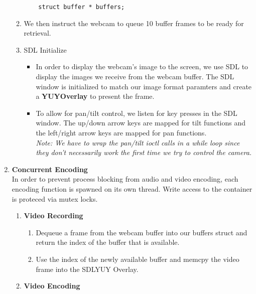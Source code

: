 \documentclass[a4paper]{article}
\begin{document}
\begin{enumerate}
\begin{enumerate}
\begin{verbatim}
	struct buffer * buffers;

			\end{verbatim}
		\item We then instruct the webcam to queue 10 buffer frames to be ready for retrieval.
		\item SDL Initialize
			\begin{itemize}
				\item In order to display the webcam's image to the screen, we use SDL to display the images we receive from the webcam buffer. The SDL window is initialized to match our image format paramters and create a \textbf{YUYOverlay} to present the frame.
				\item To allow for pan/tilt control, we listen for key presses in the SDL window. The up/down arrow keys are mapped for tilt functions and the left/right arrow keys are mapped for pan functions.
	\\\it Note: We have to wrap the pan/tilt ioctl calls in a while loop since they don't necessarily work the first time we try to control the camera.
			\end{itemize}
	\end{enumerate}
\item \textbf{Concurrent Encoding}
		\\ In order to prevent process blocking from audio and video encoding, each encoding function is spawned on its own thread. Write access to the container is proteced via mutex locks.
	\begin{enumerate}
		\item \textbf{Video Recording}
			\begin{enumerate}
				\item {} Dequeue a frame from the webcam buffer into our buffers struct and return the index of the buffer that is available.
				\item {} Use the index of the newly available buffer and memcpy the video frame into the SDLYUY Overlay.
			\end{enumerate}
		\item \textbf{Video Encoding}	
\end{enumerate}
\end{enumerate}
\end{document}
